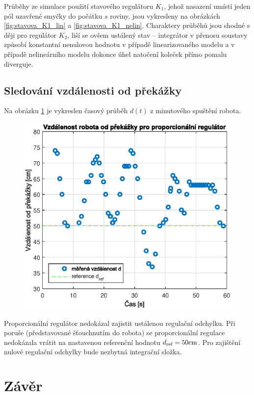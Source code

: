\documentclass[conference]{IEEEtran}
\begin{document}
Průběhy ze simulace použití stavového regulátoru $K_1$, jehož nasazení umístí jeden pól uzavřené smyčky do počátku $s$ roviny, jsou vykresleny na obrázkách 
\ref{fig:stavova_K1_lin} a \ref{fig:stavova_K1_nelin}. Charaktery průběhů jsou shodné s ději pro regulátor $K_2$, liší se ovšem ustálený stav -- integrátor v přenosu
soustavy způsobí konstantní nenulovou hodnotu v případě linearizovaného modelu a v případě nelineárního modelu dokonce úhel natočení koleček přímo pomalu diverguje.

\subsection{Sledování vzdálenosti od překážky}

Na obrázku \ref{fig:vzdalenost_P} je vykreslen časový průběh $d(t)$ z minutového spuštění robota.
\begin{figure}[htbp]
    \centerline{\includegraphics[width=\linewidth]{vzdalenost_od_prekazky_proporcionalni.eps}}
    \caption{}
    \label{fig:vzdalenost_P}        
\end{figure}
Proporcionální regulátor nedokázal zajistit ustálenou regulační odchylku. Při poruše (představované šťouchnutím do robota)
se proporcionální regulace nedokázala vrátit na nastavenou referenční hodnotu $d_\text{ref} = 50 \text{\si{\centi\metre}}$.
Pro zajištění nulové regulační odchylky bude nezbytná integrační složka.

\section{Závěr}
\end{document}

